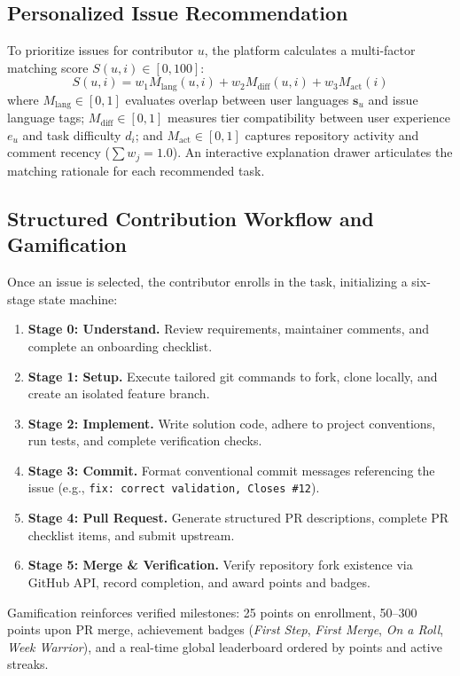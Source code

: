 \documentclass[conference]{IEEEtran}
\begin{document}
\subsection{Personalized Issue Recommendation}
To prioritize issues for contributor $u$, the platform calculates a multi-factor matching score $S(u, i) \in [0, 100]$:
\begin{equation}
S(u, i) = w_1 M_{\text{lang}}(u, i) + w_2 M_{\text{diff}}(u, i) + w_3 M_{\text{act}}(i)
\end{equation}
where $M_{\text{lang}} \in [0, 1]$ evaluates overlap between user languages $\mathbf{s}_u$ and issue language tags; $M_{\text{diff}} \in [0, 1]$ measures tier compatibility between user experience $e_u$ and task difficulty $d_i$; and $M_{\text{act}} \in [0, 1]$ captures repository activity and comment recency ($\sum w_j = 1.0$). An interactive explanation drawer articulates the matching rationale for each recommended task.

\subsection{Structured Contribution Workflow and Gamification}
Once an issue is selected, the contributor enrolls in the task, initializing a six-stage state machine:
\begin{enumerate}
    \item \textbf{Stage 0: Understand.} Review requirements, maintainer comments, and complete an onboarding checklist.
    \item \textbf{Stage 1: Setup.} Execute tailored git commands to fork, clone locally, and create an isolated feature branch.
    \item \textbf{Stage 2: Implement.} Write solution code, adhere to project conventions, run tests, and complete verification checks.
    \item \textbf{Stage 3: Commit.} Format conventional commit messages referencing the issue (e.g., \texttt{fix: correct validation, Closes \#12}).
    \item \textbf{Stage 4: Pull Request.} Generate structured PR descriptions, complete PR checklist items, and submit upstream.
    \item \textbf{Stage 5: Merge \& Verification.} Verify repository fork existence via GitHub API, record completion, and award points and badges.
\end{enumerate}

Gamification reinforces verified milestones: 25 points on enrollment, 50--300 points upon PR merge, achievement badges (\textit{First Step}, \textit{First Merge}, \textit{On a Roll}, \textit{Week Warrior}), and a real-time global leaderboard ordered by points and active streaks.
\end{document}
